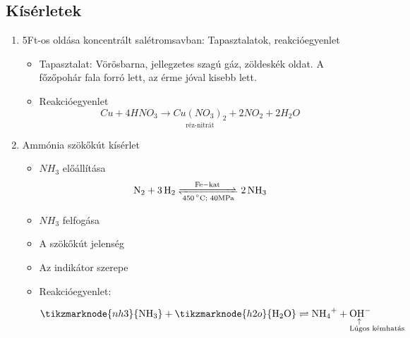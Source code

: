 \documentclass{article}
\begin{document}
\subsection{Kísérletek}
\begin{enumerate}
    \item 5Ft-os oldása koncentrált salétromsavban: Tapasztalatok, reakcióegyenlet
    \begin{itemize}
        \item Tapasztalat: Vörösbarna, jellegzetes szagú gáz, zöldeskék oldat. A főzőpohár fala forró lett, az érme jóval kisebb lett.
        \item Reakcióegyenlet
        \[
            Cu + 4HNO_3 \rightarrow \underset{\text{réz-nitrát}}{Cu(NO_3)_2} + 2NO_2 + 2H_2O
        \]
    \end{itemize}
    \item Ammónia szökőkút kísérlet
    \begin{itemize}
        \item $NH_3$ előállítása
        \[
            \ce{N2 + 3 H2 <=>[Fe-kat][\SI{450}{\degreeCelsius}\text{; 40MPa}] 2 NH3}
        \]
        \item $NH_3$ felfogása
        \item A szökőkút jelenség
        \item Az indikátor szerepe
        \item Reakcióegyenlet: 
        
                    \[
                      \tikzmarknode{nh3}{\ce{NH3}}
                      +
                      \tikzmarknode{h2o}{\ce{H2O}}
                      \rightleftharpoons
                      \ce{NH4+} + \mathrlap{\smash{\underset{\substack{\hspace{-36pt}\uparrow\\ \text{Lúgos kémhatás}}}{}}}{\ce{OH-}}
                    \]
                    
    \end{itemize}
\end{enumerate}
\end{document}
